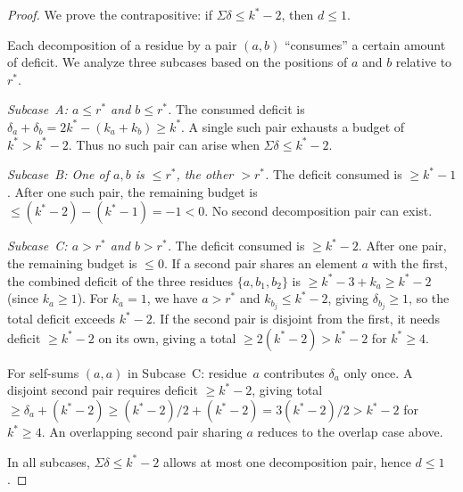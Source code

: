 \documentclass[11pt]{amsart}
\theoremstyle{definition}
\theoremstyle{remark}
\begin{document}
\begin{proof}
We prove the contrapositive: if $\Sigma\delta \le k^* - 2$, then $d \le 1$.

Each decomposition of a residue by a pair $(a, b)$ ``consumes'' a
certain amount of deficit.  We analyze three subcases based on the
positions of $a$ and $b$ relative to $r^*$.

\emph{Subcase~A: $a \le r^*$ and $b \le r^*$.}
The consumed deficit is $\delta_a + \delta_b = 2k^* - (k_a + k_b) \ge k^*$.
A single such pair exhausts a budget of $k^* > k^* - 2$.
Thus no such pair can arise when $\Sigma\delta \le k^* - 2$.

\emph{Subcase~B: One of $a, b$ is $\le r^*$, the other $> r^*$.}
The deficit consumed is $\ge k^* - 1$.
After one such pair, the remaining budget is $\le (k^* - 2) - (k^* - 1) = -1 < 0$.
No second decomposition pair can exist.

\emph{Subcase~C: $a > r^*$ and $b > r^*$.}
The deficit consumed is $\ge k^* - 2$.
After one pair, the remaining budget is $\le 0$.
If a second pair shares an element $a$ with the first,
the combined deficit of the three residues $\{a, b_1, b_2\}$ is
$\ge k^* - 3 + k_a \ge k^* - 2$ (since $k_a \ge 1$).
For $k_a = 1$, we have $a > r^*$ and $k_{b_j} \le k^* - 2$,
giving $\delta_{b_j} \ge 1$, so the total deficit exceeds $k^* - 2$.
If the second pair is disjoint from the first, it needs deficit $\ge k^* - 2$
on its own, giving a total $\ge 2(k^* - 2) > k^* - 2$ for $k^* \ge 4$.

For self-sums $(a, a)$ in Subcase~C: residue~$a$ contributes $\delta_a$ only once.
A disjoint second pair requires deficit $\ge k^* - 2$, giving
total $\ge \delta_a + (k^* - 2) \ge (k^* - 2)/2 + (k^* - 2) = 3(k^* - 2)/2
> k^* - 2$ for $k^* \ge 4$.
An overlapping second pair sharing $a$ reduces to the overlap case above.

In all subcases, $\Sigma\delta \le k^* - 2$ allows at most one decomposition
pair, hence $d \le 1$.
\end{proof}
\end{document}

